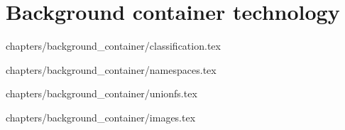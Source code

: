 \chapter{Background container technology}
\label{ch:back}

 {chapters/background_container/classification.tex}

 {chapters/background_container/namespaces.tex}


 {chapters/background_container/unionfs.tex}

 {chapters/background_container/images.tex}

















